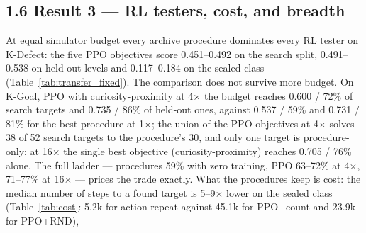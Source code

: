 \subsection*{1.6 Result 3 --- RL testers, cost, and breadth}


At equal simulator budget every archive procedure dominates every RL tester on K-Defect: the five PPO objectives score 0.451--0.492 on the
search split, 0.491--0.538 on held-out levels and 0.117--0.184 on the sealed class (Table~\ref{tab:transfer_fixed}). The comparison does not survive
more budget. On K-Goal, PPO with curiosity-proximity at 4$\times$ the budget reaches 0.600 / 72\% of search targets and 0.735 / 86\% of held-out
ones, against 0.537 / 59\% and 0.731 / 81\% for the best procedure at 1$\times$; the union of the PPO objectives at 4$\times$ solves 38 of 52 search
targets to the procedure's 30, and only one target is procedure-only; at 16$\times$ the single best objective (curiosity-proximity) reaches 0.705 / 76\% alone. The full ladder --- procedures 59\% with zero training, PPO 63--72\% at 4$\times$, 71--77\% at 16$\times$ --- prices the trade exactly. What the procedures keep is cost: the median number of steps to a found
target is 5--9$\times$ lower on the sealed class (Table~\ref{tab:cost}: 5.2k for action-repeat against 45.1k for PPO+count and 23.9k for PPO+RND),
